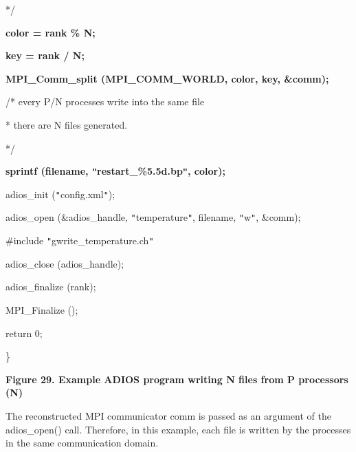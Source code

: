 \vspace{10pt}
*/

\vspace{10pt}
\parindent=0pt
{\color{color02} \textbf{color = rank \% N;}}

\vspace{10pt}
{\color{color02} \textbf{key = rank / N;}}

\vspace{10pt}
{\color{color02} \textbf{MPI\_Comm\_split (MPI\_COMM\_WORLD, color, key, \&comm);}}

\vspace{22pt}
/* every P/N processes write into the same file 

\vspace{10pt}
\parindent=7pt
* there are N files generated. 

\vspace{10pt}
*/

\vspace{10pt}
\parindent=0pt
{\color{color02} \textbf{sprintf (filename, \texttt{"}restart\_\%5.5d.bp\texttt{"}, 
color);}}

\vspace{10pt}
adios\_init (\texttt{"}config.xml\texttt{"});

\vspace{10pt}
adios\_open (\&adios\_handle, \texttt{"}temperature\texttt{"}, filename, \texttt{"}w\texttt{"}, 
\&comm);

\vspace{10pt}
\#include \texttt{"}gwrite\_temperature.ch\texttt{"}

\vspace{10pt}
adios\_close (adios\_handle);

\vspace{10pt}
adios\_finalize (rank);

\vspace{10pt}
MPI\_Finalize ();

\vspace{10pt}
return 0;

\vspace{10pt}
\leftskip=0pt
\}

\label{HRef119579635}\label{HToc144350188}

\vspace{22pt}
\leftskip=18pt
{\color{color20} \textbf{Figure 29. Example ADIOS program writing N files from 
P processors (N)}}

\vspace{10pt}
\leftskip=0pt
The reconstructed MPI communicator comm is passed as an argument of the adios\_open() 
call. Therefore, in this example, each file is written by the processes in the 
same communication domain.

